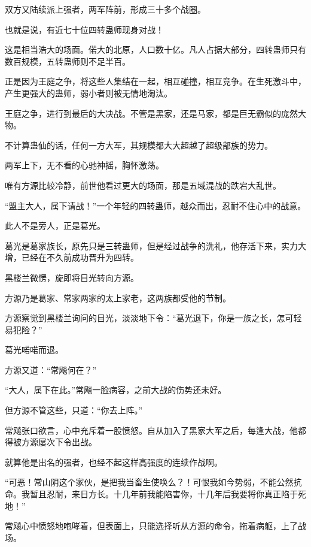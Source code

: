 \begin{this_body}
双方又陆续派上强者，两军阵前，形成三十多个战圈。

也就是说，有近七十位四转蛊师现身对战！

这是相当浩大的场面。偌大的北原，人口数十亿。凡人占据大部分，四转蛊师只有数百规模，五转蛊师则不足半百。

正是因为王庭之争，将这些人集结在一起，相互碰撞，相互竞争。在生死激斗中，产生更强大的蛊师，弱小者则被无情地淘汰。

王庭之争，进行到最后的大决战。不管是黑家，还是马家，都是巨无霸似的庞然大物。

不计算蛊仙的话，任何一方大军，其规模都大大超越了超级部族的势力。

两军上下，无不看的心驰神摇，胸怀激荡。

唯有方源比较冷静，前世他看过更大的场面，那是五域混战的跌宕大乱世。

“盟主大人，属下请战！”一个年轻的四转蛊师，越众而出，忍耐不住心中的战意。

此人不是旁人，正是葛光。

葛光是葛家族长，原先只是三转蛊师，但是经过战争的洗礼，他存活下来，实力大增，已经在不久前成功晋升为四转。

黑楼兰微愣，旋即将目光转向方源。

方源乃是葛家、常家两家的太上家老，这两族都受他的节制。

方源察觉到黑楼兰询问的目光，淡淡地下令：“葛光退下，你是一族之长，怎可轻易犯险？”

葛光喏喏而退。

方源又道：“常飚何在？”

“大人，属下在此。”常飚一脸病容，之前大战的伤势还未好。

但方源不管这些，只道：“你去上阵。”

常飚张口欲言，心中充斥着一股愤怒。自从加入了黑家大军之后，每逢大战，他都得被方源屡次下令出战。

就算他是出名的强者，也经不起这样高强度的连续作战啊。

“可恶！常山阴这个家伙，是把我当畜生使唤么？！可恨我如今势弱，不能公然抗命。我暂且忍耐，来日方长。十几年前我能陷害你，十几年后我要将你真正陷于死地！”

常飚心中愤怒地咆哮着，但表面上，只能选择听从方源的命令，拖着病躯，上了战场。

\end{this_body}

